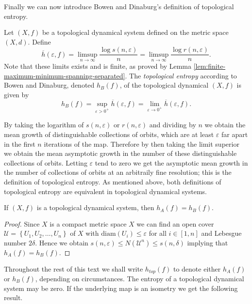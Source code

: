 Finally we can now introduce Bowen and Dinaburg's definition of topological entropy.

\begin{defn}
    Let $(X, f)$ be a topological dynamical system defined on the metric space $(X, d)$. Define \[\overline{h}(\varepsilon, f) = \limsup_{n \to \infty}\frac{\log{s(n, \varepsilon)}}{n} = \limsup_{n \to \infty} \frac{\log{r(n, \varepsilon)}}{n}.\] Note that these limits exists and is finite, as proved by Lemma \ref{lem:finite-maximum-minimum-spanning-separated}. The \emph{topological entropy} according to Bowen and Dinaburg, denoted $h_B(f)$, of the topological dynamical $(X, f)$ is given by \[h_B(f) = \sup_{\varepsilon > 0^+}\overline{h}(\varepsilon, f) = \lim_{\varepsilon \to 0^+}\overline{h}(\varepsilon, f).\]
\end{defn}

By taking the logarithm of $s(n, \varepsilon)$ or $r(n, \varepsilon)$ and dividing by $n$ we obtain the mean growth of distinguishable collections of orbits, which are at least $\varepsilon$ far apart in the first $n$ iterations of the map. Therefore by then taking the limit superior we obtain the mean asymptotic growth in the number of these distinguishable collections of orbits. Letting $\varepsilon$ tend to zero we get the asymptotic mean growth in the number of collections of orbits at an arbitraily fine resolution; this is the definition of topological entropy. As mentioned above, both definitions of topological entropy are equivalent in topological dynamical systems.

\begin{prop}
    If $(X, f)$ is a topological dynamical system, then $h_A(f) = h_B(f)$.
    \begin{proof}
        Since $X$ is a compact metric space $X$ we can find an open cover $\mathcal{U} = \left\lbrace U_1, U_2, \dots, U_n \right\rbrace$ of $X$ with $\text{diam}(U_i) \leq \varepsilon$ for all $i \in [1, n]$ and Lebesgue number $2\delta$. Hence we obtain $s(n, \varepsilon) \leq N(\mathcal{U}^n) \leq s(n, \delta)$ implying that $h_A(f) = h_B(f)$.
    \end{proof}
\end{prop}

Throughout the rest of this text we shall write $h_{top}(f)$ to denote either $h_A(f)$ or $h_B(f)$, depending on circumstances. The entropy of a topological dynamical system may be zero. If the underlying map is an isometry we get the following result.

